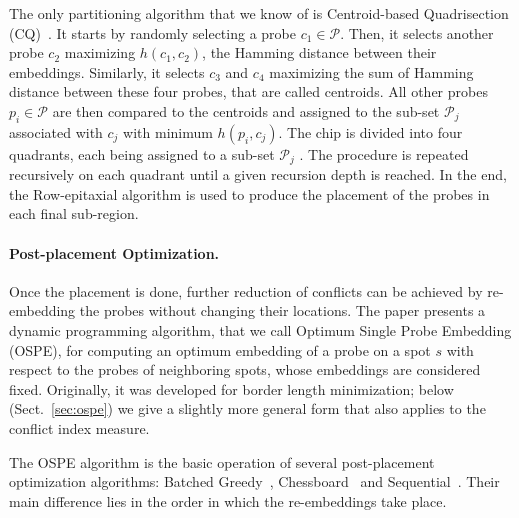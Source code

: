\documentclass{llncs}
\newcommand{\ignore}[1]{}
\begin{document}
The only partitioning algorithm that we know of is Centroid-based
Quadrisection (CQ)~\cite{KAHNG03B}. It starts by randomly selecting a probe
$c_1 \in \mathcal{P}$. Then, it selects another probe $c_2$ maximizing
$h(c_1,c_2)$, the Hamming distance between their embeddings. Similarly, it
selects $c_3$ and $c_4$ maximizing the sum of Hamming distance between these
four probes, that are called centroids. All other probes $p_i \in \mathcal{P}$
are then compared to the centroids and assigned to the sub-set $\mathcal{P}_j$
associated with $c_j$ with minimum $h(p_i,c_j)$. The chip is divided into four
quadrants, each being assigned to a sub-set $\mathcal{P}_j$ .  The procedure
is repeated recursively on each quadrant until a given recursion depth is
reached. In the end, the Row-epitaxial algorithm is used to produce the
placement of the probes in each final sub-region.


\paragraph{Post-placement Optimization.}
Once the placement is done, further reduction of conflicts can be achieved by
re-embedding the probes without changing their locations.  The paper
\cite{KAHNG02} presents a dynamic programming algorithm, that we call Optimum
Single Probe Embedding (OSPE), for computing an optimum embedding of a probe
on a spot $s$ with respect to the probes of neighboring spots, whose
embeddings are considered fixed.  Originally, it was developed for border
length minimization; below (Sect.~\ref{sec:ospe}) we give a slightly more
general form that also applies to the conflict index measure.

The OSPE algorithm is the basic operation of several post-placement
optimization algorithms: Batched Greedy~\cite{KAHNG02},
Chessboard~\cite{KAHNG02} and Sequential~\cite{KAHNG03B}. Their main
difference lies in the order in which the re-embeddings take place.

\ignore{ The first algorithm is a simple greedy approach that computes, for
  each spot of the chip, the maximum reduction of conflicts that could be
  achieved by re-embedding its probe with the OSPE algorithm. It then greedily
  selects the spot with higher gain and re-embeds its probe optimally with
  respect to its neighbors, updating the gains of affected spots. A faster
  version, called Batched Greedy, sacrifices its greedy nature by postponing
  the update of gains and re-embedding all probes that have not been affected
  by the re-embeddings performed in the current iteration.
  
  The Chessboard optimization is based on the fact that a chip can be
  bi-colored just like a chessboard, in such a way that the embeddings of
  probes located on white spots, with respect to border length, are
  independent of those placed on black spots, and vice-versa. The Chessboard
  uses this coloring to alternate the optimal re-embedding of probes located
  on black and white spots.%
}
\end{document}
